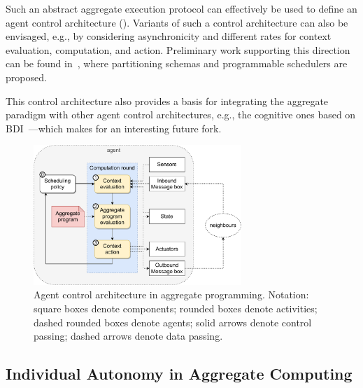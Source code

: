 \documentclass[jsan,article,accept,moreauthors,pdftex]{Definitions/mdpi}
\begin{document}
Such an abstract aggregate execution protocol %
 can effectively be used to define an {agent control architecture} ().
%
Variants of such a control architecture can also be envisaged,
 e.g.,
 by considering 
 asynchronicity and  
 different rates for context evaluation,
 computation,
 and action.
%
Preliminary work supporting this direction can be found in~\cite{DBLP:journals/fi/CasadeiPPVW20,DBLP:journals/corr/abs-2012-13806},
 where partitioning schemas and programmable schedulers are proposed.

This control architecture also provides a basis for integrating the aggregate paradigm 
 with other agent control architectures, e.g., the cognitive ones based on BDI~\cite{desilva2020bdi}---which makes for an interesting future fork.


\begin{figure}[H]
\includegraphics[width=0.7\textwidth]{imgs/aggregate-agent-control-architecture.pdf}
\caption{Agent control architecture in aggregate programming. 
Notation: square boxes denote components; rounded boxes denote activities; dashed rounded boxes denote agents; solid arrows denote control passing; dashed arrows denote data passing.}
\label{fig:aggregate-control-arch}
\end{figure}

\subsection{Individual Autonomy in Aggregate Computing}
\label{contrib-individual-autonomy}
\end{document}
